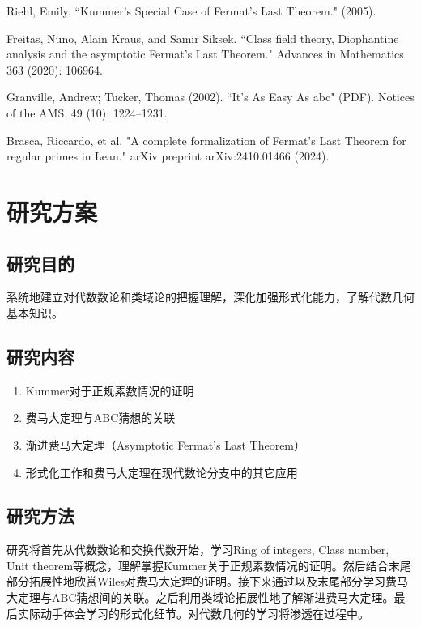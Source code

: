 \documentclass{article}
\begin{document}
\begin{thebibliography}{99}
Riehl, Emily. ``Kummer's Special Case of Fermat's Last Theorem." (2005).

Freitas, Nuno, Alain Kraus, and Samir Siksek. ``Class field theory, Diophantine analysis and the asymptotic Fermat's Last Theorem." Advances in Mathematics 363 (2020): 106964.

Granville, Andrew; Tucker, Thomas (2002). ``It's As Easy As abc" (PDF). Notices of the AMS. 49 (10): 1224–1231.

Brasca, Riccardo, et al. "A complete formalization of Fermat's Last Theorem for regular primes in Lean." arXiv preprint arXiv:2410.01466 (2024).

\end{thebibliography}

\section{研究方案}

\subsection{研究目的}

\noindent
系统地建立对代数数论和类域论的把握理解，深化加强形式化能力，了解代数几何基本知识。

\subsection{研究内容}

\begin{enumerate}
\item Kummer对于正规素数情况的证明
\item 费马大定理与ABC猜想的关联
\item 渐进费马大定理（Asymptotic Fermat's Last Theorem）
\item 形式化工作和费马大定理在现代数论分支中的其它应用
\end{enumerate}

\subsection{研究方法}

\noindent
研究将首先从代数数论\cite{ref1}\cite{ref2}\cite{ref3}\cite{ref6}和交换代数\cite{ref5}开始，学习Ring of integers, Class number, Unit theorem等概念，理解掌握Kummer关于正规素数情况的证明。然后结合\cite{ref2}末尾部分拓展性地欣赏Wiles对费马大定理的证明。接下来通过\cite{ref8}\cite{ref11}以及\cite{ref2}末尾部分学习费马大定理与ABC猜想间的关联。之后利用类域论\cite{ref4}\cite{ref6}拓展性地了解渐进费马大定理\cite{ref10}。最后实际动手体会学习\cite{ref12}的形式化细节。对代数几何\cite{ref7}的学习将渗透在过程中。
\end{document}
